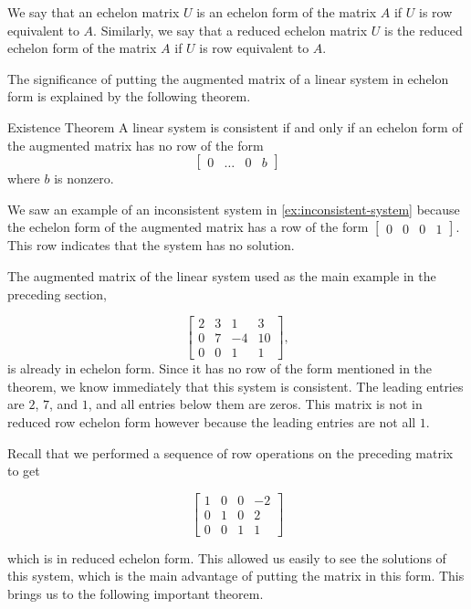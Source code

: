 We say that an echelon matrix $U$ is an echelon form of the matrix $A$ if $U$ is row equivalent to $A$. Similarly, we say that a reduced echelon matrix $U$ is the reduced echelon form of the matrix $A$ if $U$ is row equivalent to $A$.

The significance of putting the augmented matrix of a linear system in echelon form is explained by the
following theorem.

\begin{theorem}{Existence Theorem}
A linear system is consistent if and only if an echelon form of the augmented matrix has no row of the form
    \[
    \left[\begin{array}{llll}
    0 & \ldots & 0 & b
    \end{array}\right]
    \]
where $b$ is nonzero.
\end{theorem}

We saw an example of an inconsistent system in \autoref{ex:inconsistent-system} because the echelon form of the augmented matrix has a row of the form $\left[\begin{array}{lll|l} 0 & 0 & 0 & 1 \end{array}\right]$. This row indicates that the system has no solution.

\begin{example}
    The augmented matrix of the linear system used as the main example in the preceding section,

\[
\left[\begin{array}{cccc}
2 & 3 & 1 & 3 \\
0 & 7 & -4 & 10 \\
0 & 0 & 1 & 1
\end{array}\right] , 
\] is already in echelon form. Since it has no row of the form mentioned in the theorem, we know immediately
that this system is consistent. The leading entries are $2$, $7$, and $1$, and all entries below them are zeros. This matrix is not in reduced row echelon form however because the leading entries are not all $1$.
\end{example}

Recall that we performed a sequence of row operations on the preceding matrix to get

\[
\left[\begin{array}{cccc}
1 & 0 & 0 & -2 \\
0 & 1 & 0 & 2 \\
0 & 0 & 1 & 1
\end{array}\right]
\]

which is in reduced echelon form. This allowed us easily to see the solutions of this system, which is the main advantage of putting the matrix in this form. This brings us to the following important theorem.

